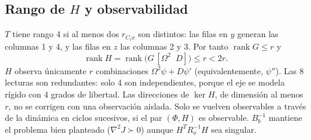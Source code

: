 \subsection{Rango de $H$ y observabilidad}

$T$ tiene rango 4 si al menos dos $r_{C_ix}$ son distintos: las filas en $y$ generan las columnas 1 y 4, y las filas en $z$ 
las columnas 2 y 3. Por tanto $\operatorname{rank}G\le r$ y
\[
\operatorname{rank}H=\operatorname{rank}\big(G\,[\Omega^2\;\;D]\big)\le r<2r .
\]
$H$ observa únicamente $r$ combinaciones $\Omega^2\psi+D\psi'$ (equivalentemente, $\psi''$). Las 8 lecturas son redundantes: 
solo 4 son independientes, porque el eje se modela rígido con 4 grados de libertad. Las direcciones de $\ker H$, de dimensión 
al menos $r$, no se corrigen con una observación aislada. Solo se vuelven observables a través de la dinámica en ciclos 
sucesivos, si el par $(\Phi,H)$ es observable. $B_b^{-1}$ mantiene el problema bien planteado ($\nabla^2J\succ0$) aunque 
$H^TR_o^{-1}H$ sea singular.